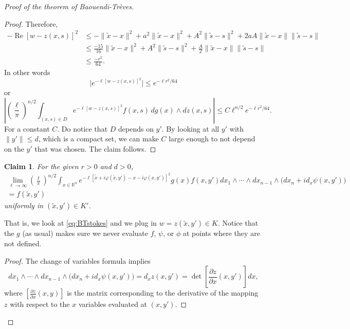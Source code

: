 \documentclass[12pt,openany]{book}
\renewcommand{\Re}{\operatorname{Re}}
\newcommand{\snorm}[1]{\lVert {#1} \rVert}
\newcommand{\babs}[1]{\bigl\lvert {#1} \bigr\rvert}
\newcommand{\abs}[1]{\left\lvert {#1} \right\rvert}
\newcommand{\R}{{\mathbb{R}}}
\theoremstyle{plain}
\newtheorem{claim}[thm]{Claim}
\theoremstyle{remark}
\theoremstyle{definition}
\theoremstyle{exercise}
\theoremstyle{example}
\begin{document}
\begin{proof}[Proof of the theorem of Baouendi-Tr{\`e}ves]
\begin{proof}
Therefore,
\begin{equation*}
\begin{split}
-\Re {[w - z(x,s)]}^2 & \leq
- \snorm{\tilde{x}-x}^2
+
a^2 \snorm{\tilde{x}-x}^2
+
A^2 \snorm{\tilde{s}-s}^2
+
2aA \snorm{\tilde{x}-x}\snorm{\tilde{s}-s}
\\
& \leq
\frac{-15}{16} \snorm{\tilde{x}-x}^2
+
A^2 \snorm{\tilde{s}-s}^2
+
\frac{A}{2} \snorm{\tilde{x}-x}\snorm{\tilde{s}-s}
\\
& \leq \frac{-r^2}{64} .
\end{split}
\end{equation*}
In other words
\begin{equation*}
\babs{
e^{-\ell[w-z(x,s)]^2}}
\leq
e^{-\ell r^2  / 64}
\end{equation*}
or
\begin{equation*}
\abs{
{\left(\frac{\ell}{\pi}\right)}^{n/2}
\int_{(x,s)\in D}
e^{-\ell [w - z(x,s)]^2} f(x,s)
\,
dg(x) 
\wedge
dz(x,s)
}
\leq
C
\ell^{n/2}
e^{-\ell r^2  / 64} .
\end{equation*}
For a constant $C$.  Do notice that $D$ depends on $y'$.  By looking at all
$y'$ with $\snorm{y'} \leq d$, which
is a compact set, we can make $C$
large enough to not depend on the $y'$ that was chosen.
The claim follows.
\end{proof}

\begin{claim}
For the given $r>0$ and $d>0$,
\begin{multline*}
\lim_{\ell\to\infty}
{\left(\frac{\ell}{\pi}\right)}^{n/2}
\int_{x \in \R^n}
e^{  -\ell [\tilde{x}+i\varphi(\tilde{x},y') - x-i\varphi(x,y')]^2 } g(x) f(x,y')
dx_1  \wedge
\cdots \wedge
dx_{n-1}
\wedge
\bigl(dx_{n} + i d_x \psi (x,y') \bigr) 
\\
= f(\tilde{x},y')
\end{multline*}
uniformly in $(\tilde{x},y') \in K'$.
\end{claim}

That is, we look at \eqref{eq:BTstokes} and we plug in $w = z(\tilde{x},y') \in K$.
Notice that the $g$ (as usual) makes sure we never evaluate $f$, $\psi$, or
$\phi$ at
points where they are not defined.

\begin{proof}
The change of variables formula implies
\begin{equation}
dx_1  \wedge
\cdots \wedge
dx_{n-1}
\wedge
\bigl(dx_{n} + i d_x \psi (x,y') \bigr) 
=
d_x z(x,y')
=
\det \left[\frac{\partial z}{\partial x}(x,y')\right] dx ,
\end{equation}
where $\left[\frac{\partial z}{\partial x}(x,y)\right]$ is the matrix
corresponding to the derivative of the mapping $z$ with respect to the $x$
variables evaluated at $(x,y')$.


\end{proof}
\end{proof}
\end{document}
